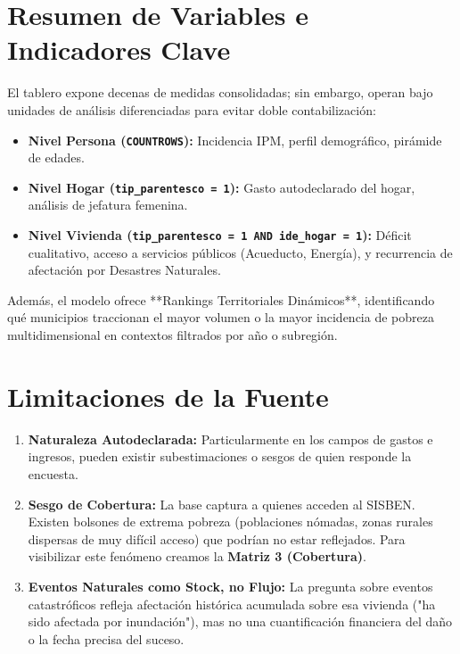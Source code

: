\documentclass[12pt, a4paper]{article}
\begin{document}
\section{Resumen de Variables e Indicadores Clave}

El tablero expone decenas de medidas consolidadas; sin embargo, operan bajo unidades de análisis diferenciadas para evitar doble contabilización:

\begin{itemize}
    \item \textbf{Nivel Persona (\texttt{COUNTROWS}):} Incidencia IPM, perfil demográfico, pirámide de edades.
    \item \textbf{Nivel Hogar (\texttt{tip\_parentesco = 1}):} Gasto autodeclarado del hogar, análisis de jefatura femenina.
    \item \textbf{Nivel Vivienda (\texttt{tip\_parentesco = 1 AND ide\_hogar = 1}):} Déficit cualitativo, acceso a servicios públicos (Acueducto, Energía), y recurrencia de afectación por Desastres Naturales.
\end{itemize}

Además, el modelo ofrece **Rankings Territoriales Dinámicos**, identificando qué municipios traccionan el mayor volumen o la mayor incidencia de pobreza multidimensional en contextos filtrados por año o subregión.

\section{Limitaciones de la Fuente}

\begin{enumerate}
    \item \textbf{Naturaleza Autodeclarada:} Particularmente en los campos de gastos e ingresos, pueden existir subestimaciones o sesgos de quien responde la encuesta.
    \item \textbf{Sesgo de Cobertura:} La base captura a quienes acceden al SISBEN. Existen bolsones de extrema pobreza (poblaciones nómadas, zonas rurales dispersas de muy difícil acceso) que podrían no estar reflejados. Para visibilizar este fenómeno creamos la \textbf{Matriz 3 (Cobertura)}.
    \item \textbf{Eventos Naturales como Stock, no Flujo:} La pregunta sobre eventos catastróficos refleja afectación histórica acumulada sobre esa vivienda ("ha sido afectada por inundación"), mas no una cuantificación financiera del daño o la fecha precisa del suceso.
\end{enumerate}
\end{document}
